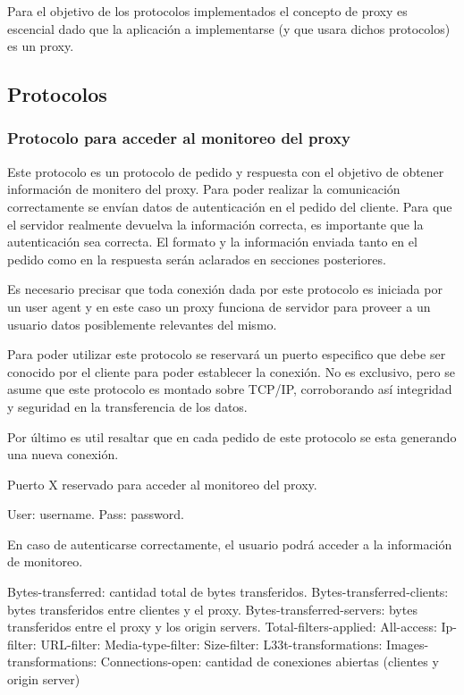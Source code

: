 \documentclass[a4paper,10pt]{article}
\begin{document}
Para el objetivo de los protocolos implementados el concepto de proxy es escencial dado que la aplicaci\'on 
a implementarse (y que usara dichos protocolos) es un proxy.


\newpage
\subsection{Protocolos}
\subsubsection{Protocolo para acceder al monitoreo del proxy}


Este protocolo es un protocolo de pedido y respuesta con el objetivo de obtener informaci\'on 
de monitero del proxy. Para poder realizar la comunicaci\'on correctamente se env\'ian datos 
de autenticaci\'on en el pedido del cliente. Para que el servidor realmente devuelva la 
informaci\'on correcta, es importante que la autenticaci\'on sea correcta. El formato y la 
informaci\'on enviada tanto en el pedido como en la respuesta ser\'an aclarados en secciones 
posteriores.

Es necesario precisar que toda conexi\'on dada por este protocolo es iniciada por un user 
agent y en este caso un proxy funciona de servidor para proveer a un usuario datos 
posiblemente relevantes del mismo.

Para poder utilizar este protocolo se reservar\'a un puerto especifico que debe ser conocido 
por el cliente para poder establecer la conexi\'on. No es exclusivo, pero se asume que este 
protocolo es montado sobre TCP/IP, corroborando as\'i integridad y seguridad en la transferencia 
de los datos.

Por \'ultimo es util resaltar que en cada pedido de este protocolo se esta generando una nueva 
conexi\'on.

Puerto X reservado para acceder al monitoreo del proxy.

User: username.
Pass: password.

En caso de autenticarse correctamente, el usuario podr\'a acceder a la información de monitoreo.

Bytes-transferred: cantidad total de bytes transferidos.
Bytes-transferred-clients: bytes transferidos entre clientes y el proxy.
Bytes-transferred-servers: bytes transferidos entre el proxy y los origin servers.
Total-filters-applied:
All-access:
Ip-filter:
URL-filter:
Media-type-filter:
Size-filter:
L33t-transformations:
Images-transformations:
Connections-open: cantidad de conexiones abiertas (clientes y origin server)
\end{document}
